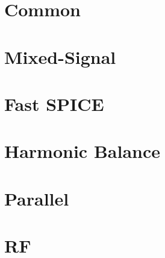 \documentclass{article}[11pt]
\begin{document}
\notetitle

\section{Common}

\cite{mccalla-casim-87}
\cite{saleh-mixmodsim-90}
\cite{ogrodzki-circsim-94}
\cite{nichols-spicealgo-94}
\cite{kielkowski-insidespice-94}
\cite{kundert-spicespectre-95}
\cite{najm-csim-10}
\cite{kundert-lifeafterspice-11}

\section{Mixed-Signal}

\cite{saleh-mixmodsim-90}

\section{Fast SPICE}

\cite{rewienski-fastspice-11}
\cite{bizzarri-fastspice-18}
\cite{white-fastspice-19}


\section{Harmonic Balance}

\cite{suarez-hbnoise-09}
\cite{kundert-steadystate-90}

\section{Parallel}

\cite{li-parallelsim-12}

\section{RF}

\cite{nastov-rfsim-07}

\printbibliography
\end{document}

